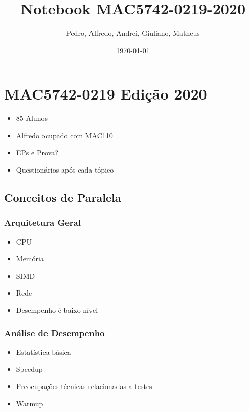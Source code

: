 \documentclass[a4paper]{article}
\author{Pedro, Alfredo, Andrei, Giuliano, Matheus}
\date{\today}
\title{Notebook MAC5742-0219-2020}
\begin{document}
\maketitle

\section{MAC5742-0219 Edição 2020}
\label{sec:org8591ac0}
\begin{itemize}
\item 85 Alunos
\item Alfredo ocupado com MAC110
\item EPs e Prova?
\item Questionários após cada tópico
\end{itemize}

\subsection{Conceitos de Paralela}
\label{sec:orgc462d6f}
\subsubsection{Arquitetura Geral}
\label{sec:org4c4dca5}
\begin{itemize}
\item CPU
\item Memória
\item SIMD
\item Rede
\item Desempenho é baixo nível
\end{itemize}
\subsubsection{Análise de Desempenho}
\label{sec:org1160d19}
\begin{itemize}
\item Estatística básica
\item Speedup
\item Preocupações técnicas relacionadas a testes
\item Warmup
\end{itemize}
\end{document}
